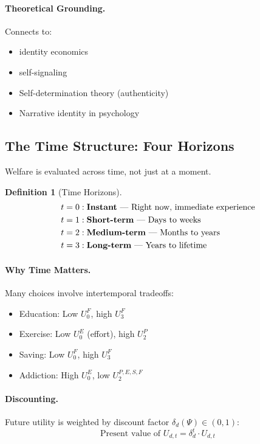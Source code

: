 \documentclass[12pt,a4paper]{article}
\newtheorem{definition}[theorem]{Definition}
\begin{document}
\paragraph{Theoretical Grounding.}
Connects to:
\begin{itemize}
  \item \citet{akerlofkranton} identity economics
  \item \citet{benaboutirole} self-signaling
  \item Self-determination theory (authenticity)
  \item Narrative identity in psychology
\end{itemize}

\subsection{The Time Structure: Four Horizons}

Welfare is evaluated across time, not just at a moment.

\begin{definition}[Time Horizons]
\begin{align*}
  t = 0 &: \text{\textbf{Instant} --- Right now, immediate experience} \\
  t = 1 &: \text{\textbf{Short-term} --- Days to weeks} \\
  t = 2 &: \text{\textbf{Medium-term} --- Months to years} \\
  t = 3 &: \text{\textbf{Long-term} --- Years to lifetime}
\end{align*}
\end{definition}

\paragraph{Why Time Matters.}
Many choices involve intertemporal tradeoffs:
\begin{itemize}
  \item Education: Low $U^F_0$, high $U^F_3$
  \item Exercise: Low $U^E_0$ (effort), high $U^P_2$
  \item Saving: Low $U^F_0$, high $U^F_3$
  \item Addiction: High $U^E_0$, low $U^{P,E,S,F}_2$
\end{itemize}

\paragraph{Discounting.}
Future utility is weighted by discount factor $\delta_d(\Psi) \in (0, 1)$:
\begin{equation}
  \text{Present value of } U_{d,t} = \delta_d^t \cdot U_{d,t}
\end{equation}
\end{document}
